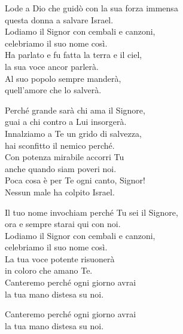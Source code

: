 
\strofa Lode a Dio che guidò con la sua forza immensa\\
questa donna a salvare Israel.\\
Lodiamo il Signor con cembali e canzoni,\\
celebriamo il suo nome così.\\
Ha parlato e fu fatta la terra e il ciel,\\
la sua voce ancor parlerà.\\
Al suo popolo sempre manderà,\\
quell'amore che lo salverà.

\spazio

\strofa Perché grande sarà chi ama il Signore,\\
guai a chi contro a Lui insorgerà.\\
Innalziamo a Te un grido di salvezza,\\
hai sconfitto il nemico perché.\\
Con potenza mirabile accorri Tu\\
anche quando siam poveri noi.\\
Poca cosa è per Te ogni canto, Signor!\\
Nessun male ha colpito Israel.

\spazio

\strofa Il tuo nome invochiam perché Tu sei il Signore,\\
ora e sempre starai qui con noi.\\
Lodiamo il Signor con cembali e canzoni,\\
celebriamo il suo nome così.\\
La tua voce potente risuonerà\\
in coloro che amano Te.\\
Canteremo perché ogni giorno avrai\\
la tua mano distesa su noi.

\spazio

Canteremo perché ogni giorno avrai\\
la tua mano distesa su noi.